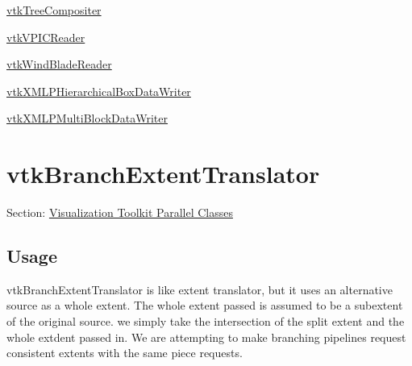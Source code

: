 \begin{DoxyItemize}
\item \hyperlink{vtkparallel_vtktreecompositer}{vtk\-Tree\-Compositer}  
\item \hyperlink{vtkparallel_vtkvpicreader}{vtk\-V\-P\-I\-C\-Reader}  
\item \hyperlink{vtkparallel_vtkwindbladereader}{vtk\-Wind\-Blade\-Reader}  
\item \hyperlink{vtkparallel_vtkxmlphierarchicalboxdatawriter}{vtk\-X\-M\-L\-P\-Hierarchical\-Box\-Data\-Writer}  
\item \hyperlink{vtkparallel_vtkxmlpmultiblockdatawriter}{vtk\-X\-M\-L\-P\-Multi\-Block\-Data\-Writer}  
\end{DoxyItemize}\hypertarget{vtkparallel_vtkbranchextenttranslator}{}\section{vtk\-Branch\-Extent\-Translator}\label{vtkparallel_vtkbranchextenttranslator}
Section\-: \hyperlink{sec_vtkparallel}{Visualization Toolkit Parallel Classes} \hypertarget{vtkwidgets_vtkxyplotwidget_Usage}{}\subsection{Usage}\label{vtkwidgets_vtkxyplotwidget_Usage}
vtk\-Branch\-Extent\-Translator is like extent translator, but it uses an alternative source as a whole extent. The whole extent passed is assumed to be a subextent of the original source. we simply take the intersection of the split extent and the whole extdent passed in. We are attempting to make branching pipelines request consistent extents with the same piece requests.

